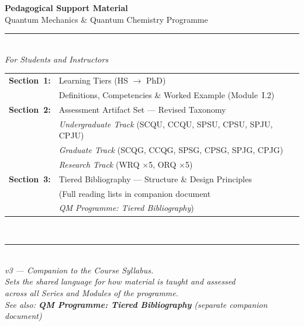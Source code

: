\documentclass[11pt,a4paper]{article}
\begin{document}

\begin{titlepage}
\pagecolor{darkblue}
\color{white}
\vspace*{2.5cm}
\begin{center}
  {\fontsize{26}{32}\selectfont\bfseries Pedagogical Support Material}\\[0.5cm]
  {\fontsize{16}{22}\selectfont Quantum Mechanics \& Quantum Chemistry Programme}\\[0.6cm]
  {\color{accentgold}\rule{10cm}{2pt}}\\[0.6cm]
  {\large\itshape For Students and Instructors}\\[2cm]
  \begin{tabular}{cl}
    \textbf{Section~1:} & Learning Tiers (HS $\to$ PhD)\\[2pt]
                        & \quad Definitions, Competencies \& Worked Example (Module~I.2)\\[8pt]
    \textbf{Section~2:} & Assessment Artifact Set --- Revised Taxonomy\\[2pt]
                        & \quad \textit{Undergraduate Track} (SCQU, CCQU, SPSU, CPSU, SPJU, CPJU)\\[2pt]
                        & \quad \textit{Graduate Track} (SCQG, CCQG, SPSG, CPSG, SPJG, CPJG)\\[2pt]
                        & \quad \textit{Research Track} (WRQ $\times$5, ORQ $\times$5)\\[8pt]
    \textbf{Section~3:} & Tiered Bibliography --- Structure \& Design Principles\\[2pt]
                        & \quad (Full reading lists in companion document\\[2pt]
                        & \quad \textit{QM Programme: Tiered Bibliography})\\
  \end{tabular}\\[2cm]
  {\color{accentgold}\rule{10cm}{1pt}}\\[0.5cm]
  {\small\itshape v3 --- Companion to the Course Syllabus.\\
  Sets the shared language for \emph{how} material is taught and assessed\\
  across all Series and Modules of the programme.\\[4pt]
  See also: \textbf{QM Programme: Tiered Bibliography} (separate companion document)}
\end{center}
\vfill
\end{titlepage}
\nopagecolor
\end{document}
